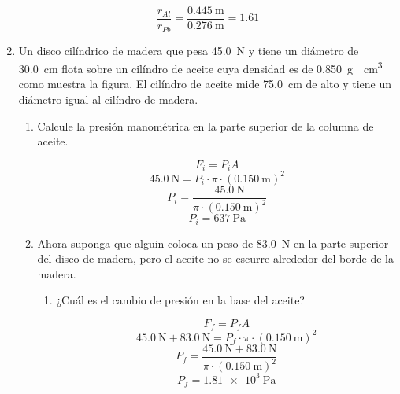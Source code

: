\documentclass[Física - Práctica.root.tex]{subfiles}
\begin{document}
\begin{enumerate}
        \[\frac{r_{Al}}{r_{Pb}}=\frac{\SI{0,445}{\meter}}{\SI{0,276}{\meter}}=\boxed{\num{1,61}}\]

  \item Un disco cilíndrico de madera que pesa \SI{45,0}{\newton} y tiene un diámetro de \SI{30,0}{\centi\meter} flota sobre un cilíndro de aceite cuya densidad es de \SI{0,850}{\gram\over\centi\meter\cubed} como muestra la figura. El cilíndro de aceite mide \SI{75,0}{\centi\meter} de alto y tiene un diámetro igual al cilíndro de madera.

        \begin{center}
        \end{center}

        \begin{enumerate}
          \item Calcule la presión manométrica en la parte superior de la columna de aceite.

                \[F_i=P_iA\]
                \[\SI{45,0}{\newton}=P_i\cdot\pi\cdot(\SI{0,150}{\meter})^2\]
                \[P_i=\frac{\SI{45,0}{\newton}}{\pi\cdot(\SI{0,150}{\meter})^2}\]
                \[P_i=\boxed{\SI{637}{\pascal}}\]

          \item Ahora suponga que alguin coloca un peso de \SI{83,0}{\newton} en la parte superior del disco de madera, pero el aceite no se escurre alrededor del borde de la madera.

                \begin{enumerate}
                  \item ¿Cuál es el cambio de presión en la base del aceite?

                        \[F_f=P_fA\]
                        \[\SI{45,0}{\newton}+\SI{83,0}{\newton}=P_f\cdot\pi\cdot(\SI{0,150}{\meter})^2\]
                        \[P_f=\frac{\SI{45,0}{\newton}+\SI{83,0}{\newton}}{\pi\cdot(\SI{0,150}{\meter})^2}\]
                        \[P_f=\SI{1,81e3}{\pascal}\]


\end{enumerate}
\end{enumerate}
\end{enumerate}
\end{document}
